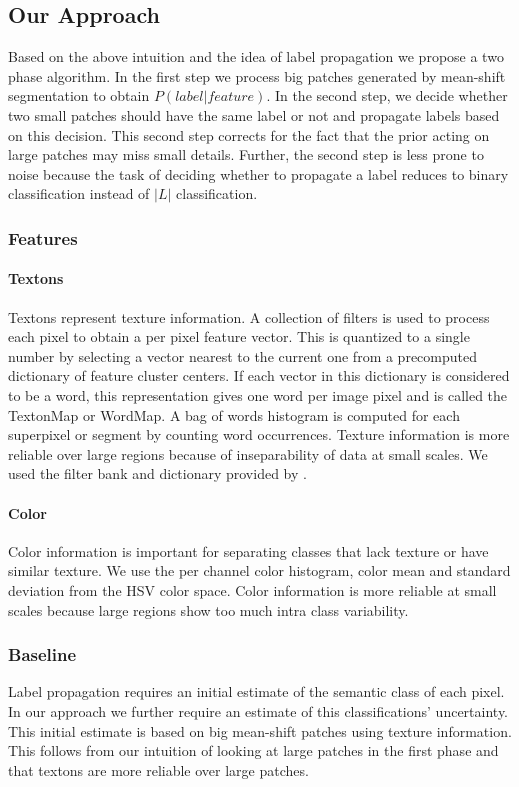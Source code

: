 \documentclass{article} %
\begin{document}
\subsection{Our Approach}
Based on the above intuition and the idea of label propagation we propose a two phase algorithm. In the first step we process big patches generated by mean-shift segmentation to obtain $P(label | feature)$. In the second step, we decide whether two small patches should have the same label or not and propagate labels based on this decision. This second step corrects for the fact that the prior acting on large patches may miss small details. Further, the second step is less prone to noise because the task of deciding whether to propagate a label reduces to binary classification instead of $|L|$ classification.
\subsubsection{Features}
\paragraph{Textons}
Textons represent texture information.
A collection of filters is used to process each pixel to obtain a per
pixel feature vector.
This is quantized to a single number by selecting a vector nearest to the
current one from a precomputed dictionary of feature cluster centers.
If each vector in this dictionary is considered to be a word, this
representation gives one word per image pixel and is called the TextonMap
or WordMap. %
A bag of words histogram is computed for each superpixel or segment by
counting word occurrences.
Texture information is more reliable over large regions because of inseparability of data at small scales.
We used the filter bank and dictionary provided by \cite{malisiewicz-cvpr08}.

\paragraph{Color}
Color information is important for separating classes that lack texture or
have similar texture.
We use the per channel color histogram, color mean and standard deviation
from the HSV color space.
Color information is more reliable at small scales because large regions show too much intra class variability.

\subsubsection{Baseline}
\label{baseline}
Label propagation requires an initial estimate of the semantic class of each pixel. In our approach we further require an estimate of this classifications' uncertainty. This initial estimate is based on big mean-shift patches using texture information. This follows from our intuition of looking at large patches in the first phase and that textons are more reliable over large patches.
\end{document}
